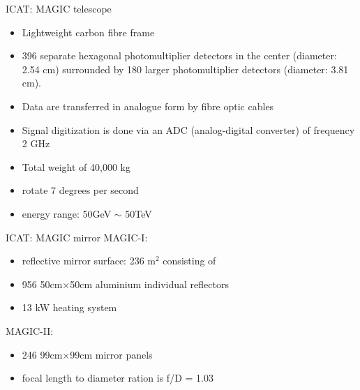 \documentclass{beamer}
\begin{document}
\begin{frame}{ICAT: MAGIC telescope}
	\begin{itemize}
        \item Lightweight carbon fibre frame
        \item 396 separate hexagonal photomultiplier detectors in the center (diameter: 2.54 cm) surrounded by 180 larger photomultiplier detectors (diameter: 3.81 cm).
        \item Data are transferred in analogue form by fibre optic cables
        \item Signal digitization is done via an ADC (analog-digital converter) of frequency 2 GHz
        \item Total weight of 40,000 kg
        \item rotate 7 degrees per second
        \item energy range: 50GeV $\sim$ 50TeV
	\end{itemize}
\end{frame}


\begin{frame}{ICAT: MAGIC mirror}
    MAGIC-I:
	\begin{itemize}
        \item reflective mirror surface: 236 $\text{m}^2$ consisting of
        \item 956 50cm×50cm aluminium individual reflectors
        \item 13 kW heating system
    \end{itemize}
    \hfill \break
    MAGIC-II:
    \begin{itemize}
        \item 246 99cm×99cm mirror panels
        \item focal length to diameter ration is f/D = 1.03
    \end{itemize}

    \begin{figure}
        \centering
        \qquad
    \end{figure}
\end{frame}
\end{document}
